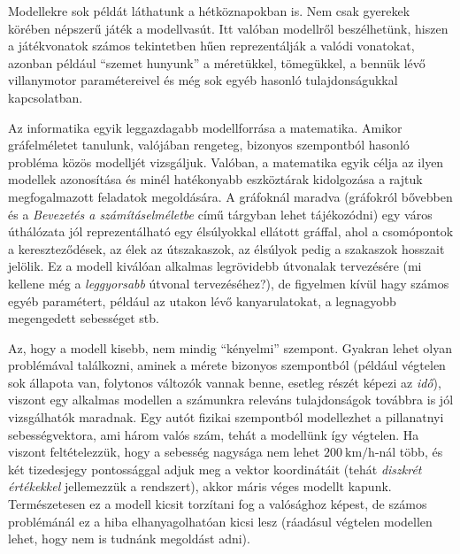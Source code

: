 \begin{pelda}
	Modellekre sok példát láthatunk a hétköznapokban is. Nem csak gyerekek körében népszerű játék a modellvasút. Itt valóban modellről beszélhetünk, hiszen a játékvonatok számos tekintetben hűen reprezentálják a valódi vonatokat, azonban például ``szemet hunyunk'' a méretükkel, tömegükkel, a bennük lévő villanymotor paramétereivel és még sok egyéb hasonló tulajdonságukkal kapcsolatban.
	
	Az informatika egyik leggazdagabb modellforrása a matematika. Amikor gráfelméletet tanulunk, valójában rengeteg, bizonyos szempontból hasonló probléma közös modelljét vizsgáljuk. Valóban, a matematika egyik célja az ilyen modellek azonosítása és minél hatékonyabb eszköztárak kidolgozása a rajtuk megfogalmazott feladatok megoldására. A gráfoknál maradva (gráfokról bővebben  és a \emph{Bevezetés a számításelméletbe} című tárgyban lehet tájékozódni) egy város úthálózata jól reprezentálható egy élsúlyokkal ellátott gráffal, ahol a csomópontok a kereszteződések, az élek az útszakaszok, az élsúlyok pedig a szakaszok hosszait jelölik. Ez a modell kiválóan alkalmas legrövidebb útvonalak tervezésére (mi kellene még a \emph{leggyorsabb} útvonal tervezéséhez?), de figyelmen kívül hagy számos egyéb paramétert, például az utakon lévő kanyarulatokat, a legnagyobb megengedett sebességet stb.
\end{pelda}

\begin{megjegyzes}
	Az, hogy a modell kisebb, nem mindig ``kényelmi'' szempont. Gyakran lehet olyan problémával találkozni, aminek a mérete bizonyos szempontból  (például végtelen sok állapota van, folytonos változók vannak benne, esetleg részét képezi az \emph{idő}), viszont egy alkalmas  modellen a számunkra releváns tulajdonságok továbbra is jól vizsgálhatók maradnak. Egy autót fizikai szempontból modellezhet a pillanatnyi sebességvektora, ami három valós szám, tehát a modellünk így végtelen. Ha viszont feltételezzük, hogy a sebesség nagysága nem lehet $200~\textrm{km/h}$-nál több, és két tizedesjegy pontossággal adjuk meg a vektor koordinátáit (tehát \emph{diszkrét értékekkel} jellemezzük a rendszert), akkor máris véges modellt kapunk. Természetesen ez a modell kicsit torzítani fog a valósághoz képest, de számos problémánál ez a hiba elhanyagolhatóan kicsi lesz (ráadásul végtelen modellen lehet, hogy nem is tudnánk megoldást adni).
\end{megjegyzes}

